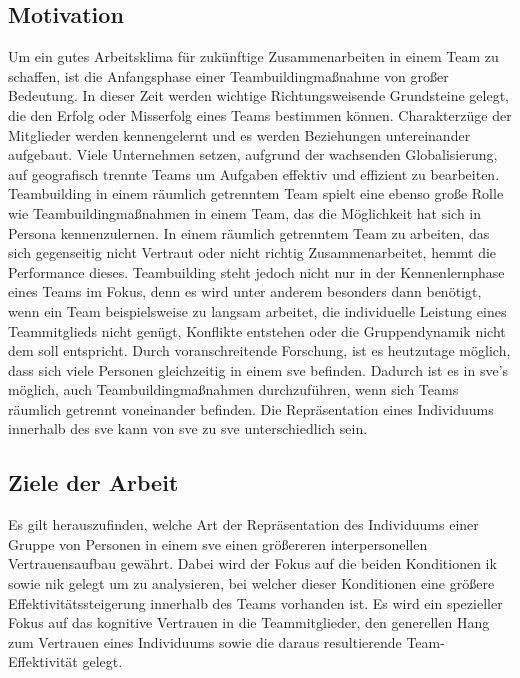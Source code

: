 \documentclass[a4paper,11pt]{article}%
\renewcommand{\\}{\vspace*{0.5\baselineskip} \newline}
\begin{document}
	\subsection{Motivation}
	Um ein gutes Arbeitsklima für zukünftige Zusammenarbeiten in einem Team zu schaffen, ist die Anfangsphase einer Teambuildingmaßnahme von großer Bedeutung. In dieser Zeit werden wichtige Richtungsweisende Grundsteine gelegt, die den Erfolg oder Misserfolg eines Teams bestimmen können. Charakterzüge der Mitglieder werden kennengelernt und es werden Beziehungen untereinander aufgebaut. \\	
	Viele Unternehmen setzen, aufgrund der wachsenden Globalisierung, auf geografisch trennte Teams um Aufgaben effektiv und effizient zu bearbeiten. Teambuilding in einem räumlich getrenntem Team spielt eine ebenso große Rolle wie Teambuildingmaßnahmen in einem Team, das die Möglichkeit hat sich in Persona kennenzulernen. \\
	In einem räumlich getrenntem Team zu arbeiten, das sich gegenseitig nicht Vertraut oder nicht richtig Zusammenarbeitet, hemmt die Performance dieses. \citep[p. 98-107]{huang1998supporting} \citep[p. 399-417]{turoff1993distributed} \\	
	Teambuilding steht jedoch nicht nur in der Kennenlernphase eines Teams im Fokus, denn es wird unter anderem besonders dann benötigt, wenn ein Team beispielsweise zu langsam arbeitet, die individuelle Leistung eines Teammitglieds nicht genügt, Konflikte entstehen oder die Gruppendynamik nicht dem soll entspricht. \citep[p. 1-3]{biech2007pfeiffer}\\
	Durch voranschreitende Forschung, ist es heutzutage möglich, dass sich viele Personen gleichzeitig in einem \glqq \ac{sve} \grqq befinden. Dadurch ist es in \ac{sve}'s möglich, auch Teambuildingmaßnahmen durchzuführen, wenn sich Teams räumlich getrennt voneinander befinden.\\
	Die Repräsentation eines Individuums innerhalb des \ac{sve} kann von \ac{sve} zu \ac{sve} unterschiedlich sein.
	
	\subsection{Ziele der Arbeit}
		Es gilt herauszufinden, welche Art der Repräsentation des Individuums einer Gruppe von Personen in einem \ac{sve} einen größereren interpersonellen Vertrauensaufbau gewährt.
Dabei wird der Fokus auf die beiden Konditionen \ac{ik} sowie \ac{nik} gelegt um zu analysieren, bei welcher dieser Konditionen eine größere Effektivitätssteigerung innerhalb des Teams vorhanden ist.
Es wird ein spezieller Fokus auf das kognitive Vertrauen in die Teammitglieder, den generellen Hang zum Vertrauen eines Individuums sowie die daraus resultierende Team-Effektivität gelegt.
\end{document}
